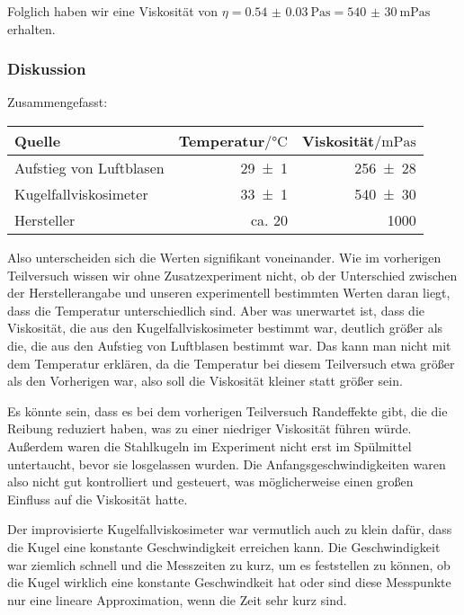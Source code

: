 		Folglich haben wir eine Viskosität von $\eta = \SI{0.54(3)}{\pascal\second} = \SI{540(30)}{\milli\pascal\second}$ erhalten.

	\subsubsection{Diskussion}
		Zusammengefasst:
		\begin{center}
			\begin{tabular}{lrr}
				\toprule
				Quelle & Temperatur$/\si{\celsius}$ & Viskosität$/\si{\milli\pascal\second}$ \\
				\midrule
				Aufstieg von Luftblasen & \num{29(1)} & \num{256(28)} \\
				Kugelfallviskosimeter & \num{33(1)} & \num{540(30)} \\
				Hersteller & ca. \num{20} & \num{1000} \\
				\bottomrule
			\end{tabular}
		\end{center}
		Also unterscheiden sich die Werten signifikant voneinander. Wie im vorherigen Teilversuch wissen wir ohne Zusatzexperiment nicht, ob der Unterschied zwischen der Herstellerangabe und unseren experimentell bestimmten Werten daran liegt, dass die Temperatur unterschiedlich sind. Aber was unerwartet ist, dass die Viskosität, die aus den Kugelfallviskosimeter bestimmt war, deutlich größer als die, die aus den Aufstieg von Luftblasen bestimmt war. Das kann man nicht mit dem Temperatur erklären, da die Temperatur bei diesem Teilversuch etwa größer als den Vorherigen war, also soll die Viskosität kleiner statt größer sein. 

		Es könnte sein, dass es bei dem vorherigen Teilversuch Randeffekte gibt, die die Reibung reduziert haben, was zu einer niedriger Viskosität führen würde. Außerdem waren die Stahlkugeln im Experiment nicht erst im Spülmittel untertaucht, bevor sie losgelassen wurden. Die Anfangsgeschwindigkeiten waren also nicht gut kontrolliert und gesteuert, was möglicherweise einen großen Einfluss auf die Viskosität hatte. 

		Der improvisierte Kugelfallviskosimeter war vermutlich auch zu klein dafür, dass die Kugel eine konstante Geschwindigkeit erreichen kann. Die Geschwindigkeit war ziemlich schnell und die Messzeiten zu kurz, um es feststellen zu können, ob die Kugel wirklich eine konstante Geschwindkeit hat oder sind diese Messpunkte nur eine lineare Approximation, wenn die Zeit sehr kurz sind.

